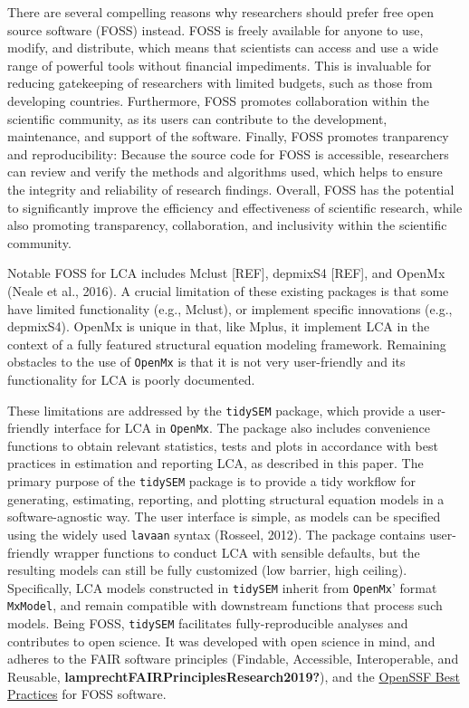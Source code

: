 \documentclass[
  ,man,floatsintext]{apa6}
\begin{document}
There are several compelling reasons why researchers should prefer free open source software (FOSS) instead.
FOSS is freely available for anyone to use, modify, and distribute, which means that scientists can access and use a wide range of powerful tools without financial impediments.
This is invaluable for reducing gatekeeping of researchers with limited budgets, such as those from developing countries.
Furthermore, FOSS promotes collaboration within the scientific community,
as its users can contribute to the development, maintenance, and support of the software.
Finally, FOSS promotes tranparency and reproducibility: Because the source code for FOSS is accessible,
researchers can review and verify the methods and algorithms used,
which helps to ensure the integrity and reliability of research findings.
Overall, FOSS has the potential to significantly improve the efficiency and effectiveness of scientific research, while also promoting transparency, collaboration, and inclusivity within the scientific community.

Notable FOSS for LCA includes Mclust {[}REF{]}, depmixS4 {[}REF{]}, and OpenMx (Neale et al., 2016).
A crucial limitation of these existing packages is that some have limited functionality (e.g., Mclust),
or implement specific innovations (e.g., depmixS4).
OpenMx is unique in that, like Mplus, it implement LCA in the context of a fully featured structural equation modeling framework.
Remaining obstacles to the use of \texttt{OpenMx} is that it is not very user-friendly and its functionality for LCA is poorly documented.

These limitations are addressed by the \texttt{tidySEM} package,
which provide a user-friendly interface for LCA in \texttt{OpenMx}.
The package also includes convenience functions to obtain relevant statistics, tests and plots in accordance with best practices in estimation and reporting LCA, as described in this paper.
The primary purpose of the \texttt{tidySEM} package is to provide a tidy workflow for generating, estimating, reporting, and plotting structural equation models in a software-agnostic way.
The user interface is simple, as models can be specified using the widely used \texttt{lavaan} syntax (Rosseel, 2012).
The package contains user-friendly wrapper functions to conduct LCA with sensible defaults,
but the resulting models can still be fully customized (low barrier, high ceiling).
Specifically, LCA models constructed in \texttt{tidySEM} inherit from \texttt{OpenMx}' format \texttt{MxModel}, and remain compatible with downstream functions that process such models.
Being FOSS, \texttt{tidySEM} facilitates fully-reproducible analyses and contributes to open science.
It was developed with open science in mind,
and adheres to the FAIR software principles (Findable, Accessible, Interoperable, and Reusable, \textbf{lamprechtFAIRPrinciplesResearch2019?}),
and the \href{https://bestpractices.coreinfrastructure.org/en/criteria}{OpenSSF Best Practices} for FOSS software.
\end{document}
